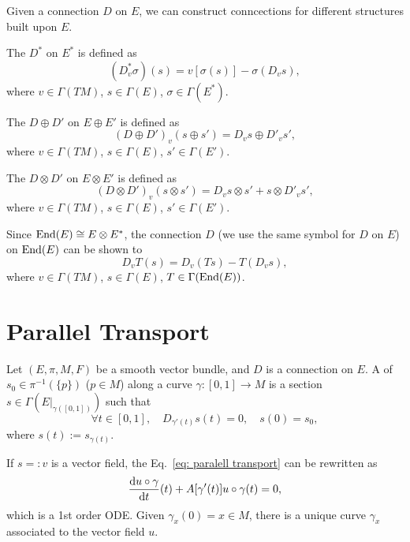 \documentclass[openany, oneside, a5paper]{book}
\begin{document}
Given a connection $D$ on $E$, we can construct conncections for different structures built upon $E$.

The  $D^*$ on $E^*$ is defined as
\begin{equation}
    (D^*_v \sigma) (s) = v[\sigma(s)] - \sigma (D_v s),
\end{equation}
where $v \in \Gamma(TM)$, $s \in \Gamma(E)$, $\sigma \in \Gamma(E^*)$.

The  $D \oplus D'$ on $E \oplus E'$ is defined as
\begin{equation}
    (D \oplus D')_v (s \oplus s') = D_v s \oplus D'_v s',
\end{equation}
where $v \in \Gamma(TM)$, $s \in \Gamma(E)$, $s' \in \Gamma(E')$.

The  $D \otimes D'$ on $E \otimes E'$ is defined as
\begin{equation}
    (D \otimes D')_v (s \otimes s') = D_v s \otimes s' + s \otimes D'_v s',
\end{equation}
where $v \in \Gamma(TM)$, $s \in \Gamma(E)$, $s' \in \Gamma(E')$.

Since $\operatorname{End}(E) \cong E \otimes E^*$, the connection $D$ (we use the same symbol for $D$ on $E$) on $\operatorname{End}(E)$ can be shown to 
\begin{equation}
    D_v T (s) = D_v(Ts) - T(D_v s),
\end{equation}
where $v \in \Gamma(TM)$, $s \in \Gamma(E)$, $T \in \Gamma(\operatorname{End}(E))$.


\section{Parallel Transport}

\begin{definition}
    Let $(E, \pi, M, F)$ be a smooth vector bundle, and $D$ is a connection on $E$.
    A  of $s_0 \in \pi^{-1}(\{p\})$ ($p \in M$) along a curve $\gamma \colon [0, 1] \to M$ is a section $s \in \Gamma(E|_{\gamma([0, 1])})$ such that
    \begin{equation}\label{eq: paralell transport}
        \forall t \in [0, 1], 
        \quad 
        D_{\gamma'(t)} s(t) = 0,
        \quad
        s(0) = s_0,
    \end{equation}
    where $s(t) := s_{\gamma(t)}$.
\end{definition}

If $s =:v$ is a vector field, the Eq.~\eqref{eq: paralell transport} can be rewritten as
\begin{equation}
    \diff {u \circ \gamma} {t} (t) + A[\gamma'(t)] u \circ \gamma(t) = 0,
\end{equation}
which is a 1st order ODE.
Given $\gamma_x(0) = x \in M$, there is a unique curve $\gamma_x$ associated to the vector field $u$.
\end{document}
